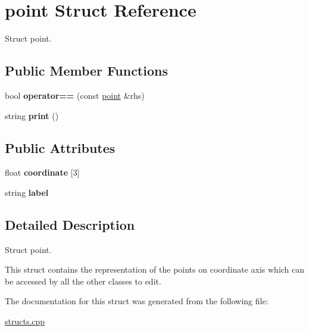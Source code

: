 \hypertarget{structpoint}{}\section{point Struct Reference}
\label{structpoint}


Struct point.  


\subsection*{Public Member Functions}
\begin{DoxyCompactItemize}
\item 
bool {\bfseries operator==} (const \hyperlink{structpoint}{point} \&rhs)\hypertarget{structpoint_ab7d525ec6723f8960ae67505562cc49a}{}\label{structpoint_ab7d525ec6723f8960ae67505562cc49a}

\item 
string {\bfseries print} ()\hypertarget{structpoint_af90e6b5c7b1e845241e8e9a2cdf1b666}{}\label{structpoint_af90e6b5c7b1e845241e8e9a2cdf1b666}

\end{DoxyCompactItemize}
\subsection*{Public Attributes}
\begin{DoxyCompactItemize}
\item 
float {\bfseries coordinate} \mbox{[}3\mbox{]}\hypertarget{structpoint_abdc2a15801d6d33f19ef4b612940dd04}{}\label{structpoint_abdc2a15801d6d33f19ef4b612940dd04}

\item 
string {\bfseries label}\hypertarget{structpoint_aac98b52176e98d5ae6ab04ff1351fb14}{}\label{structpoint_aac98b52176e98d5ae6ab04ff1351fb14}

\end{DoxyCompactItemize}


\subsection{Detailed Description}
Struct point. 

This struct contains the representation of the points on coordinate axis which can be accessed by all the other classes to edit. 

The documentation for this struct was generated from the following file\+:\begin{DoxyCompactItemize}
\item 
\hyperlink{structs_8cpp}{structs.\+cpp}\end{DoxyCompactItemize}
